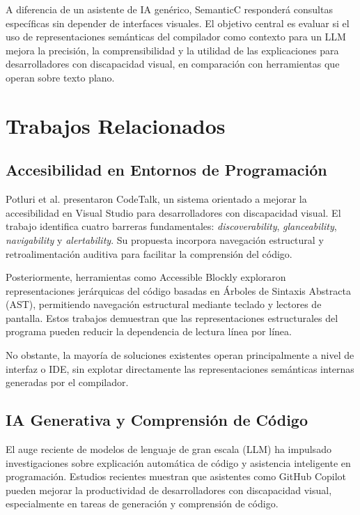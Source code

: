 \documentclass[conference]{IEEEtran}
\begin{document}
A diferencia de un asistente de IA genérico, SemanticC responderá consultas específicas sin depender de interfaces visuales. El objetivo central es evaluar si el uso de representaciones semánticas del compilador como contexto para un LLM mejora la precisión, la comprensibilidad y la utilidad de las explicaciones para desarrolladores con discapacidad visual, en comparación con herramientas que operan sobre texto plano.

\section{Trabajos Relacionados}
\subsection{Accesibilidad en Entornos de Programación}
Potluri et al. \cite{codetalk} presentaron CodeTalk, un sistema orientado a mejorar la accesibilidad en Visual Studio para desarrolladores con discapacidad visual. El trabajo identifica cuatro barreras fundamentales: \textit{discoverability}, \textit{glanceability}, \textit{navigability} y \textit{alertability}. Su propuesta incorpora navegación estructural y retroalimentación auditiva para facilitar la comprensión del código.

Posteriormente, herramientas como Accessible Blockly \cite{accessible_blockly} exploraron representaciones jerárquicas del código basadas en Árboles de Sintaxis Abstracta (AST), permitiendo navegación estructural mediante teclado y lectores de pantalla. Estos trabajos demuestran que las representaciones estructurales del programa pueden reducir la dependencia de lectura línea por línea.

No obstante, la mayoría de soluciones existentes operan principalmente a nivel de interfaz o IDE, sin explotar directamente las representaciones semánticas internas generadas por el compilador.

\subsection{IA Generativa y Comprensión de Código}
El auge reciente de modelos de lenguaje de gran escala (LLM) ha impulsado investigaciones sobre explicación automática de código y asistencia inteligente en programación. Estudios recientes \cite{genai_accessibility} muestran que asistentes como GitHub Copilot pueden mejorar la productividad de desarrolladores con discapacidad visual, especialmente en tareas de generación y comprensión de código.
\end{document}
